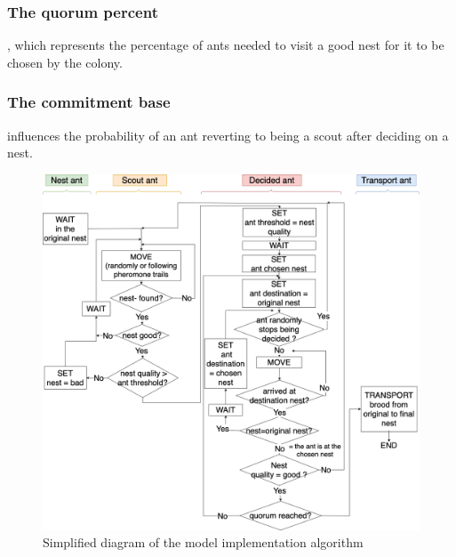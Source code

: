 \documentclass[9pt]{pnas-new}
\begin{document}
\subsubsection*{The quorum percent}, which represents the percentage of ants needed to visit a good nest for it to be chosen by the colony.
\subsubsection*{The commitment base} influences the probability of an ant reverting to being a scout after deciding on a nest.
\begin{figure}[h!tbp]
    \centering
    \includegraphics[width=1\linewidth]{report-template/fig/implementation.png}
    \caption{Simplified diagram of the model implementation algorithm}
    \label{fig:implementdiag}
\end{figure}
\end{document}
